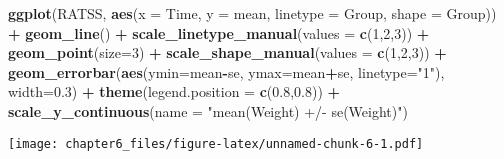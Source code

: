 \documentclass[]{article}
\newenvironment{Shaded}{\begin{snugshade}}{\end{snugshade}}
\newcommand{\CommentTok}[1]{\textcolor[rgb]{0.56,0.35,0.01}{\textit{#1}}}
\newcommand{\DataTypeTok}[1]{\textcolor[rgb]{0.13,0.29,0.53}{#1}}
\newcommand{\DecValTok}[1]{\textcolor[rgb]{0.00,0.00,0.81}{#1}}
\newcommand{\FloatTok}[1]{\textcolor[rgb]{0.00,0.00,0.81}{#1}}
\newcommand{\KeywordTok}[1]{\textcolor[rgb]{0.13,0.29,0.53}{\textbf{#1}}}
\newcommand{\NormalTok}[1]{#1}
\newcommand{\OperatorTok}[1]{\textcolor[rgb]{0.81,0.36,0.00}{\textbf{#1}}}
\newcommand{\StringTok}[1]{\textcolor[rgb]{0.31,0.60,0.02}{#1}}
\begin{document}
\begin{Shaded}
\begin{Highlighting}[]
\KeywordTok{ggplot}\NormalTok{(RATSS, }\KeywordTok{aes}\NormalTok{(}\DataTypeTok{x =}\NormalTok{ Time, }\DataTypeTok{y =}\NormalTok{ mean, }\DataTypeTok{linetype =}\NormalTok{ Group, }\DataTypeTok{shape =}\NormalTok{ Group)) }\OperatorTok{+}
\StringTok{  }\KeywordTok{geom_line}\NormalTok{() }\OperatorTok{+}
\StringTok{  }\KeywordTok{scale_linetype_manual}\NormalTok{(}\DataTypeTok{values =} \KeywordTok{c}\NormalTok{(}\DecValTok{1}\NormalTok{,}\DecValTok{2}\NormalTok{,}\DecValTok{3}\NormalTok{)) }\OperatorTok{+}
\StringTok{  }\KeywordTok{geom_point}\NormalTok{(}\DataTypeTok{size=}\DecValTok{3}\NormalTok{) }\OperatorTok{+}
\StringTok{  }\KeywordTok{scale_shape_manual}\NormalTok{(}\DataTypeTok{values =} \KeywordTok{c}\NormalTok{(}\DecValTok{1}\NormalTok{,}\DecValTok{2}\NormalTok{,}\DecValTok{3}\NormalTok{)) }\OperatorTok{+}
\StringTok{  }\KeywordTok{geom_errorbar}\NormalTok{(}\KeywordTok{aes}\NormalTok{(}\DataTypeTok{ymin=}\NormalTok{mean}\OperatorTok{-}\NormalTok{se, }\DataTypeTok{ymax=}\NormalTok{mean}\OperatorTok{+}\NormalTok{se, }\DataTypeTok{linetype=}\StringTok{"1"}\NormalTok{), }\DataTypeTok{width=}\FloatTok{0.3}\NormalTok{) }\OperatorTok{+}
\StringTok{  }\KeywordTok{theme}\NormalTok{(}\DataTypeTok{legend.position =} \KeywordTok{c}\NormalTok{(}\FloatTok{0.8}\NormalTok{,}\FloatTok{0.8}\NormalTok{)) }\OperatorTok{+}
\StringTok{  }\KeywordTok{scale_y_continuous}\NormalTok{(}\DataTypeTok{name =} \StringTok{"mean(Weight) +/- se(Weight)"}\NormalTok{)}
\end{Highlighting}
\end{Shaded}

\texttt{[image: chapter6\_files/figure-latex/unnamed-chunk-6-1.pdf]}

\begin{Shaded}
\end{Shaded}
\end{document}
